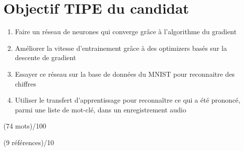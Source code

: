 \documentclass[12pt,a4paper, french]{article}
\begin{document}
\section*{Objectif TIPE du candidat}
\begin{enumerate}
    \item Faire un réseau de neurones qui converge grâce à l’algorithme du gradient
    \item Améliorer la vitesse d'entrainement grâce à des optimizers basés sur la descente de gradient
    \item Essayer ce réseau sur la base de données du MNIST pour reconnaitre des chiffres
    \item Utiliser le transfert d'apprentissage pour reconnaître ce qui a été prononcé, parmi une liste de mot-clé, dans un enregistrement audio
\end{enumerate}
(74 mots)/100


\newpage
 (9 références)/10

\end{document}

